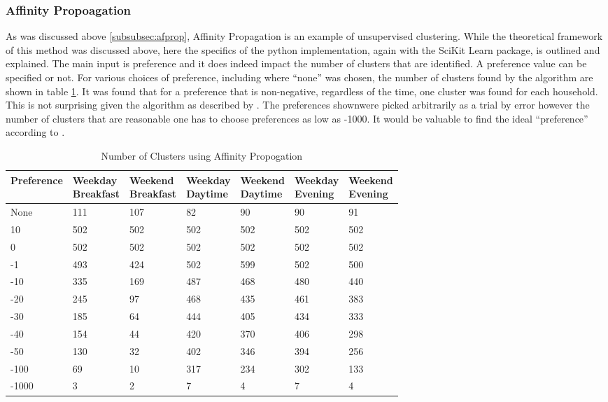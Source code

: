 \documentclass[a4paper]{article}
\begin{document}
\subsubsection{Affinity Propoagation} \label{subsubsec:affprop_res}
As was discussed above \ref{subsubsec:afprop}, Affinity Propagation is an example of unsupervised clustering. While the theoretical framework of this method was discussed above, here the specifics of the python implementation, again with the SciKit Learn package, is outlined and explained. The main input is preference and it does indeed impact the number of clusters that are identified. A preference value can be specified or not. For various choices of preference, including where ``none'' was chosen, the number of clusters found by the algorithm are shown in table \ref{tab:affprop}. It was found that for a preference that is non-negative, regardless of the time, one cluster was found for each household. This is not surprising given the algorithm as described by \cite{frey07}. The preferences shownwere picked arbitrarily as a trial by error however the number of clusters that are reasonable one has to choose preferences as low as -1000. It would be valuable to find the ideal ``preference'' according to \cite{frey07}. 

\begin{table}
\centering
\begin{tabular}{|l|l|l|l|l|l|l|}
\hline
\textbf{Preference} & \thead{\textbf{Weekday} \\ \textbf{Breakfast}} &\thead{\textbf{Weekend} \\ \textbf{ Breakfast}} &\thead{\textbf{Weekday} \\ \textbf{Daytime}} &\thead{\textbf{Weekend} \\ \textbf{Daytime}} &\thead{\textbf{Weekday} \\ \textbf{Evening}} &\thead{\textbf{Weekend} \\ \textbf{Evening}} \\
\hline
None & 111 & 107 & 82 &90 &90 &91\\
\hline
10  & 502 & 502& 502& 502& 502& 502\\
\hline
0 & 502& 502& 502& 502& 502& 502\\
\hline
-1 & 493& 424& 502& 599& 502& 500\\
\hline
-10 & 335& 169& 487& 468& 480& 440\\
\hline
-20 &245 &97 &468 & 435& 461&383\\
\hline
-30 &185 &64 &444 &405 &434 &333\\
\hline
-40 &154 &44 & 420&370 & 406&298\\
\hline
-50 &130 &32 & 402& 346& 394&256\\
\hline
-100 &69 & 10&317 &234 &302 &133\\
\hline
-1000 &3 & 2& 7& 4& 7&4\\
\hline
\end{tabular}
\caption{Number of Clusters using Affinity Propogation}
\label{tab:affprop}
\end{table}
\end{document}
